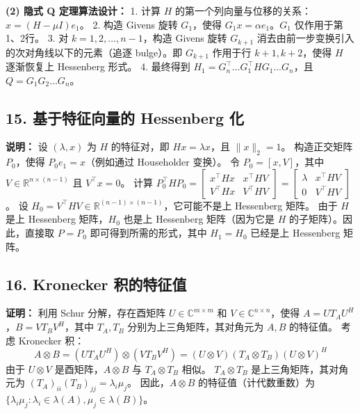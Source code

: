 \documentclass{article}
\begin{document}
\textbf{(2) 隐式 Q 定理算法设计：}
1. 计算 \(H\) 的第一个列向量与位移的关系：\(x = (H - \mu I) e_1\)。
2. 构造 Givens 旋转 \(G_1\)，使得 \(G_1 x = \alpha e_1\)。\(G_1\) 仅作用于第1、2行。
3. 对 \(k = 1, 2, \dots, n-1\)，构造 Givens 旋转 \(G_{k+1}\) 消去由前一步变换引入的次对角线以下的元素（追逐 bulge）。即 \(G_{k+1}\) 作用于行 \(k+1, k+2\)，使得 \(H\) 逐渐恢复上 Hessenberg 形式。
4. 最终得到 \(H_1 = G_{n}^\top \dots G_1^\top H G_1 \dots G_n\)，且 \(Q = G_1 G_2 \dots G_n\)。

\subsection*{15. 基于特征向量的 Hessenberg 化}
\textbf{说明：}
设 \((\lambda, x)\) 为 \(H\) 的特征对，即 \(Hx = \lambda x\)，且 \(\|x\|_2 = 1\)。
构造正交矩阵 \(P_0\)，使得 \(P_0 e_1 = x\)（例如通过 Householder 变换）。
令 \(P_0 = [x, V]\)，其中 \(V \in \mathbb{R}^{n \times (n-1)}\) 且 \(V^\top x = 0\)。
计算 \(P_0^\top H P_0 = \begin{bmatrix} x^\top H x & x^\top H V \\ V^\top H x & V^\top H V \end{bmatrix} = \begin{bmatrix} \lambda & x^\top H V \\ 0 & V^\top H V \end{bmatrix}\)。
设 \(H_0 = V^\top H V \in \mathbb{R}^{(n-1) \times (n-1)}\)，它可能不是上 Hessenberg 矩阵。
由于 \(H\) 是上 Hessenberg 矩阵，\(H_0\) 也是上 Hessenberg 矩阵（因为它是 \(H\) 的子矩阵）。因此，直接取 \(P = P_0\) 即可得到所需的形式，其中 \(H_1 = H_0\) 已经是上 Hessenberg 矩阵。

\subsection*{16. Kronecker 积的特征值}
\textbf{证明：}
利用 Schur 分解，存在酉矩阵 \(U \in \mathbb{C}^{m \times m}\) 和 \(V \in \mathbb{C}^{n \times n}\)，使得 \(A = U T_A U^H\)，\(B = V T_B V^H\)，其中 \(T_A, T_B\) 分别为上三角矩阵，其对角元为 \(A, B\) 的特征值。
考虑 Kronecker 积：
\[
 A \otimes B = (U T_A U^H) \otimes (V T_B V^H) = (U \otimes V) (T_A \otimes T_B) (U \otimes V)^H 
\]
由于 \(U \otimes V\) 是酉矩阵，\(A \otimes B\) 与 \(T_A \otimes T_B\) 相似。
\(T_A \otimes T_B\) 是上三角矩阵，其对角元为 \((T_A)_{ii} (T_B)_{jj} = \lambda_i \mu_j\)。
因此，\(A \otimes B\) 的特征值（计代数重数）为 \(\{\lambda_i \mu_j : \lambda_i \in \lambda(A), \mu_j \in \lambda(B)\}\)。
\end{document}
